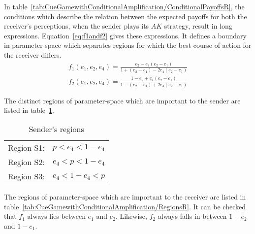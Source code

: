 \documentclass[a4paper,12pt]{article}
\numberwithin{equation}{section}
\begin{document}
In table~\ref{tab:CueGamewithConditionalAmplification/ConditionalPayoffsR}, the conditions which describe the relation between the expected payoffs for both the receiver's perceptions, when the sender plays its $AK$ strategy, result in long expressions. Equation~\ref{eq:f1andf2} gives these expressions. It defines a boundary in parameter-space which separates regions for which the best course of action for the receiver differs. 
\begin{subequations}
\label{eq:f1andf2}
\begin{gather}
f_{1}(e_{1},e_{2},e_{4})=\frac{e_{2}-e_{4}(e_{2}-e_{1})}{1+(e_{2}-e_{1})-2 e_{4}(e_{2}-e_{1})}\\
f_{2}(e_{1},e_{2},e_{4})=\frac{1-e_{2}+e_{4}(e_{2}-e_{1})}{1-(e_{2}-e_{1})+2 e_{4}(e_{2}-e_{1})}
\end{gather}
\end{subequations}

The distinct regions of parameter-space which are important to the sender are listed in table~\ref{tab:CueGamewithConditionalAmplification/RegionsS}.

\begin{table}[h]
\begin{center}
\begin{tabular}{lc}
Region S1: & $p<e_{4}<1-e_{4}$\\
Region S2: & $e_{4}<p<1-e_{4}$\\
Region S3: & $e_{4}<1-e_{4}<p$
\end{tabular}
\end{center}
\caption{Sender's regions}
\label{tab:CueGamewithConditionalAmplification/RegionsS}
\end{table}

The regions of parameter-space which are important to the receiver are listed in table~\ref{tab:CueGamewithConditionalAmplification/RegionsR}. It can be checked that $f_{1}$ always lies between $e_{1}$ and $e_{2}$. Likewise, $f_{2}$ always falls in between $1-e_{2}$ and $1-e_{1}$.
\end{document}
